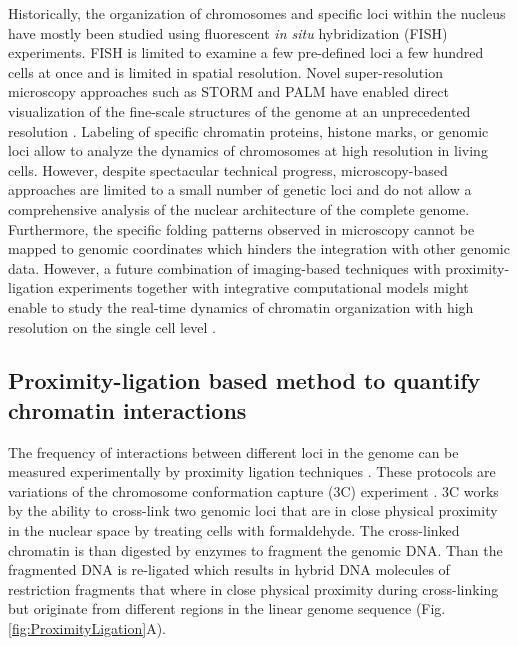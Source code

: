 \documentclass[a4paper,twoside=true,openright,parskip=full,chapterprefix=true,11pt,headings=normal,bibliography=totoc,listof=totoc,titlepage=on,captions=tableabove,draft=false]{scrreprt}
\theoremstyle{definition}
\theoremstyle{definition}
\theoremstyle{definition}
\theoremstyle{remark}
\begin{document}
Historically, the organization of chromosomes and specific loci within
the nucleus have mostly been studied using fluorescent \emph{in situ}
hybridization (FISH) experiments. FISH is limited to examine a few
pre-defined loci a few hundred cells at once and is limited in spatial
resolution. Novel super-resolution microscopy approaches such as STORM
and PALM have enabled direct visualization of the fine-scale structures
of the genome at an unprecedented resolution \citep{Bonev2016}. Labeling
of specific chromatin proteins, histone marks, or genomic loci allow to
analyze the dynamics of chromosomes at high resolution in living cells.
However, despite spectacular technical progress, microscopy-based
approaches are limited to a small number of genetic loci and do not
allow a comprehensive analysis of the nuclear architecture of the
complete genome. Furthermore, the specific folding patterns observed in
microscopy cannot be mapped to genomic coordinates which hinders the
integration with other genomic data. However, a future combination of
imaging-based techniques with proximity-ligation experiments together
with integrative computational models might enable to study the
real-time dynamics of chromatin organization with high resolution on the
single cell level \citep[\citet{Flyamer2017}]{Stevens2017}.

\subsection{Proximity-ligation based method to quantify chromatin
interactions}\label{proximity-ligation-based-method-to-quantify-chromatin-interactions}

The frequency of interactions between different loci in the genome can
be measured experimentally by proximity ligation techniques
\citep{Sati2017, Schmitt2016}. These protocols are variations of the
chromosome conformation capture (3C) experiment \citep{Dekker2002}. 3C
works by the ability to cross-link two genomic loci that are in close
physical proximity in the nuclear space by treating cells with
formaldehyde. The cross-linked chromatin is than digested by enzymes to
fragment the genomic DNA. Than the fragmented DNA is re-ligated which
results in hybrid DNA molecules of restriction fragments that where in
close physical proximity during cross-linking but originate from
different regions in the linear genome sequence
\citep{Dekker2013, Andrey2017} (Fig. \ref{fig:ProximityLigation}A).
\end{document}
